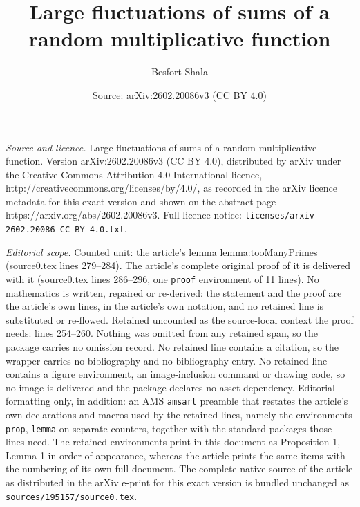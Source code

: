 \documentclass[10pt,a4paper]{amsart}
\title{Large fluctuations of sums of a random multiplicative function}
\author{Besfort Shala}
\date{Source: arXiv:2602.20086v3 (CC BY 4.0)}
\begin{document}
\maketitle

\noindent\emph{Source and licence.} Large fluctuations of sums of a random multiplicative function. Version arXiv:2602.20086v3 (CC BY 4.0), distributed by arXiv under the Creative Commons Attribution 4.0 International licence, http://creativecommons.org/licenses/by/4.0/, as recorded in the arXiv licence metadata for this exact version and shown on the abstract page https://arxiv.org/abs/2602.20086v3. Full licence notice: \texttt{licenses/arxiv-2602.20086-CC-BY-4.0.txt}.\par\smallskip

\noindent\textit{Editorial scope.} Counted unit: the article's lemma lemma:tooManyPrimes (source0.tex lines 279--284). The article's complete original proof of it is delivered with it (source0.tex lines 286--296, one \texttt{proof} environment of 11 lines). No mathematics is written, repaired or re-derived: the statement and the proof are the article's own lines, in the article's own notation, and no retained line is substituted or re-flowed.  Retained uncounted as the source-local context the proof needs: lines 254--260.  Nothing was omitted from any retained span, so the package carries no omission record.  No retained line contains a citation, so the wrapper carries no bibliography and no bibliography entry.  No retained line contains a figure environment, an image-inclusion command or drawing code, so no image is delivered and the package declares no asset dependency.  Editorial formatting only, in addition: an AMS \texttt{amsart} preamble that restates the article's own declarations and macros used by the retained lines, namely the environments \texttt{prop}, \texttt{lemma} on separate counters, together with the standard packages those lines need.  The retained environments print in this document as Proposition 1, Lemma 1 in order of appearance, whereas the article prints the same items with the numbering of its own full document.  The complete native source of the article as distributed in the arXiv e-print for this exact version is bundled unchanged as \texttt{sources/195157/source0.tex}.
\end{document}
